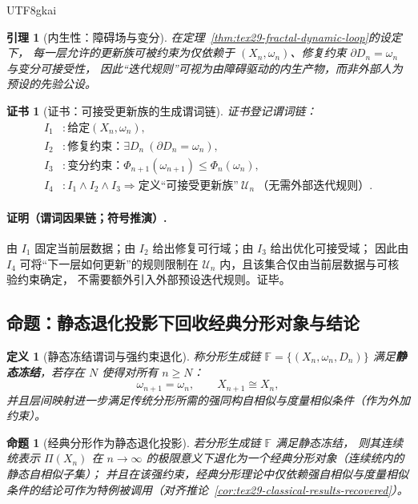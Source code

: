 \documentclass[12pt]{article}
\newtheorem{definition}{定义}[section]
\newtheorem{proposition}{命题}[section]
\newtheorem{lemma}{引理}[section]
\newtheorem{Certificate}{证书}[section]
\newcommand{\KouJing}{\texorpdfstring{表述约定}{表述约定}}
\begin{document}
\begin{CJK*}{UTF8}{gkai}
\begin{lemma}[内生性：障碍场与变分]
\label{lem:tex29-fractal-no-external-iteration}
在定理~\ref{thm:tex29-fractal-dynamic-loop}的设定下，
每一层允许的更新族可被约束为仅依赖于 $(X_n,\omega_n)$、修复约束 $\partial D_n=\omega_n$ 与变分可接受性，
因此“迭代规则”可视为由障碍驱动的内生产物，而非外部人为预设的先验公设。
\end{lemma}

\begin{Certificate}[证书：可接受更新族的生成谓词链]
\label{cert:tex29-fractal-no-external-iteration}
证书登记谓词链：
\[
\begin{aligned}
  I_1 &: \text{给定}(X_n,\omega_n),\\
  I_2 &: \text{修复约束：}\exists D_n\ (\partial D_n=\omega_n),\\
  I_3 &: \text{变分约束：}\Phi_{n+1}(\omega_{n+1})\le \Phi_n(\omega_n),\\
  I_4 &: I_1\wedge I_2\wedge I_3\Rightarrow \text{定义“可接受更新族”}\ \mathcal{U}_n\ \text{（无需外部迭代规则）}.
\end{aligned}
\]
\end{Certificate}

\paragraph{证明（谓词因果链；符号推演）.}
由 $I_1$ 固定当前层数据；由 $I_2$ 给出修复可行域；由 $I_3$ 给出优化可接受域；
因此由 $I_4$ 可将“下一层如何更新”的规则限制在 $\mathcal{U}_n$ 内，且该集合仅由当前层数据与可核验约束确定，
不需要额外引入外部预设迭代规则。证毕。

\subsection{命题：静态退化投影下回收经典分形对象与结论}
\label{subsec:tex29-fractal-static-degeneration}

\begin{definition}[静态冻结谓词与强约束退化]
称分形生成链 $\mathbb{F}=\{(X_n,\omega_n,D_n)\}$ 满足\textbf{静态冻结}，若存在 $N$ 使得对所有 $n\ge N$：
\[
  \omega_{n+1}=\omega_n,\qquad X_{n+1}\cong X_n,
\]
并且层间映射进一步满足传统分形所需的强同构自相似与度量相似条件（作为外加约束）。
\end{definition}

\begin{proposition}[经典分形作为静态退化投影]
\label{prop:tex29-fractal-static-degeneration}
若分形生成链 $\mathbb{F}$ 满足静态冻结，
则其连续统表示 $\Pi(X_n)$ 在 $n\to\infty$ 的极限意义下退化为一个经典分形对象（连续统内的静态自相似子集）；
并且在该强约束，经典分形理论中仅依赖强自相似与度量相似条件的结论可作为特例被调用（对齐推论~\ref{cor:tex29-classical-results-recovered}）。
\end{proposition}


\end{CJK*}
\end{document}
